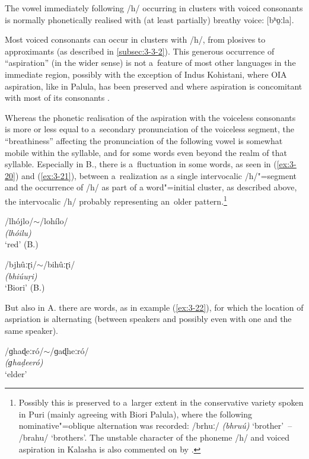 The vowel immediately following /h/ occurring in clusters with voiced consonants is normally phonetically realised with (at least partially) breathy voice: [bʱo̤ːla]. 


Most voiced consonants can occur in clusters with /h/, from plosives to approximants (as described in \ref{subsec:3-3-2}). This generous occurrence of ``aspiration'' (in the wider sense) is not a~feature of most other languages in the immediate region, possibly with the exception of Indus Kohistani, where OIA aspiration, like in Palula, has been preserved and where aspiration is concomitant with most of its consonants \citep[19--25]{hallberghallberg1999}. 


Whereas the phonetic realisation of the aspiration with the voiceless consonants is more or less equal to a~secondary pronunciation of the voiceless segment, the ``breathiness'' affecting the pronunciation of the following vowel is somewhat mobile within the syllable, and for some words even beyond the realm of that syllable. Especially in B., there is a~fluctuation in some words, as seen in (\ref{ex:3-20}) and (\ref{ex:3-21}), between a~realization as a single intervocalic /h/"=segment and the occurrence of /h/ as part of a word"=initial cluster, as described above, the intervocalic /h/ probably representing an~older pattern.\footnote{Possibly this is preserved to a~larger extent in the conservative variety spoken in Puri (mainly agreeing with Biori Palula), where the following nominative"=oblique alternation was recorded: /brhuː/ \textit{(bhruú)} `brother'~-- /brahu/ `brothers'. The unstable character of the phoneme /h/ and voiced aspiration in Kalasha is also commented on by \citet[50]{morchheegaard1997}.}

\begin{exe}
\extab
\label{ex:3-20}
/lhójlo/$\sim$/lohílo/ \\
\textit{(lhóilu)} \\
`red' (B.)

\extab
\label{ex:3-21}
/bjhûːɽi/$\sim$/bihûːɽi/ \\
\textit{(bhiúuṛi)} \\
`Biori' (B.)
\end{exe}

But also in A. there are words, as in example (\ref{ex:3-22}), for which the location of aspriation is alternating (between speakers and possibly even with one and the same speaker).

\begin{exe}
\extab
\label{ex:3-22}
/ɡhaɖeːró/$\sim$/ɡaɖheːró/ \\
\textit{(ɡhaḍeeró)} \\
`elder'
\end{exe}

